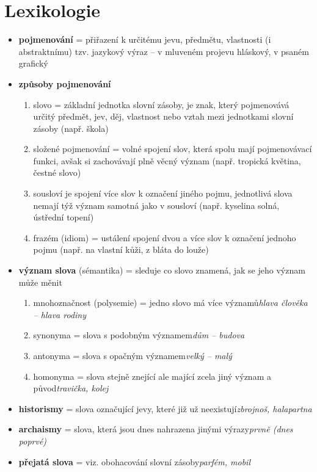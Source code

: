 \documentclass{memoir}
\begin{document}
\section*{Lexikologie}
	\begin{itemize}
		\item \textbf{pojmenování} = přiřazení k určitému jevu, předmětu, vlastnosti (i abstraktnímu) tzv. jazykový výraz -- v mluveném projevu hláskový, v psaném grafický
		\item \textbf{způsoby pojmenování}
		\begin{enumerate}
			\item slovo = základní jednotka slovní zásoby, je znak, který pojmenovává určitý předmět, jev, děj, vlastnost nebo vztah mezi jednotkami slovní zásoby (např. škola)
			\item složené pojmenování = volné spojení slov, která spolu mají pojmenovávací funkci, avšak si zachovávají plně věcný význam (např. tropická květina, čestné slovo)
			\item sousloví je spojení více slov k označení jiného pojmu, jednotlivá slova nemají týž význam samotná jako v sousloví (např. kyselina solná, ústřední topení)
			\item frazém (idiom) = ustálení spojení dvou a více slov k označení jednoho pojmu (např. na vlastní kůži, z bláta do louže)
		\end{enumerate}
		\item \textbf{význam slova} (sémantika) = sleduje co slovo znamená, jak se jeho význam může měnit
		\begin{enumerate}
			\item mnohoznačnost (polysemie) = jedno slovo má více významů\hfill\textit{hlava člověka – hlava rodiny}
			\item synonyma = slova s podobným významem\hfill\textit{dům – budova}
			\item antonyma = slova s opačným významem\hfill\textit{velký – malý}
			\item homonyma = slova stejně znející ale mající zcela jiný význam a původ\hfill\textit{travička, kolej}
		\end{enumerate}
		\item \textbf{historismy} = slova označující jevy, které již už neexistují\hfill\textit{zbrojnoš, halapartna}
		\item \textbf{archaismy} = slova, která jsou dnes nahrazena jinými výrazy\hfill\textit{prvně (dnes poprvé)}
		\item \textbf{přejatá slova} = viz. obohacování slovní zásoby\hfill\textit{parfém, mobil}

\end{itemize}
\end{document}
